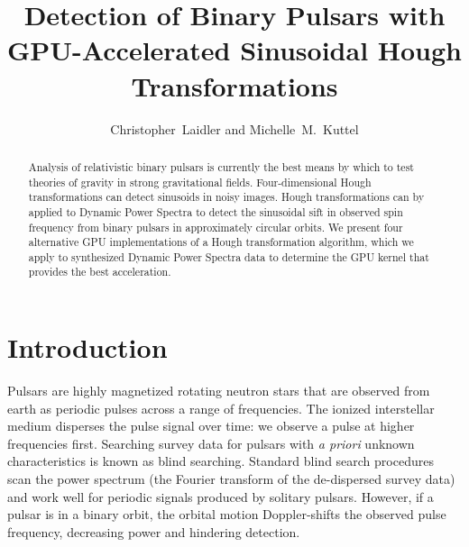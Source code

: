 


\resetcounters




\title{Detection of Binary Pulsars with GPU-Accelerated Sinusoidal Hough Transformations}
\author{Christopher~Laidler and Michelle~M.~Kuttel
}

\begin{abstract}
Analysis of relativistic binary pulsars is currently the best means by which to test theories of gravity in strong gravitational fields.
Four-dimensional Hough transformations can detect sinusoids in noisy images.
Hough transformations can by applied to Dynamic Power Spectra to detect the sinusoidal sift in observed spin frequency from binary pulsars in approximately circular orbits.
We present four  alternative GPU implementations of a Hough transformation algorithm, which we apply to synthesized  Dynamic Power Spectra data to determine  the GPU kernel that provides the best acceleration.
\end{abstract}

\section{Introduction}
Pulsars are highly magnetized rotating neutron stars that are observed from earth as periodic pulses across a range of frequencies.
The ionized interstellar medium disperses the pulse signal over time:  we observe a pulse at higher frequencies first.
Searching survey data for pulsars with \emph{a priori }unknown characteristics is known as blind searching.
Standard blind search procedures scan the power spectrum (the Fourier transform of the de-dispersed survey data) and work well for periodic signals produced by solitary pulsars.
However, if a pulsar is in a binary orbit, the orbital motion Doppler-shifts the observed pulse frequency, decreasing power and hindering detection.

